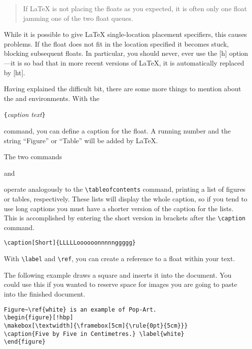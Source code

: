 \begin{quote}
If \LaTeX{} is not placing the floats as you expected,
it is often only one float jamming one of the two float queues.
\end{quote}                 

While it is possible to give \LaTeX{}  single-location placement
specifiers, this causes problems.  If the float does not fit in the
location specified it becomes stuck, blocking subsequent floats.
In particular, you should never, ever use the [h] option---it is so bad
that in more recent versions of \LaTeX, it is automatically replaced by
[ht].

\bigskip
\noindent Having explained the difficult bit, there are some more things to
mention about the  and  environments.
With the 

\begin{lscommand}
\verb|{|\emph{caption text}\verb|}|
\end{lscommand}

\noindent command, you can define a caption for the float. A running number and
the string ``Figure'' or ``Table'' will be added by \LaTeX.

The two commands

\begin{lscommand}
 and  
\end{lscommand}

\noindent operate analogously to the \verb|\tableofcontents| command,
printing a list of figures or tables, respectively.  These lists will
display the whole caption, so if you tend to use long captions
you must have a shorter version of the caption for the lists.
This is accomplished by entering the short version in brackets after
the \verb|\caption| command.
\begin{code}
\verb|\caption[Short]{LLLLLoooooonnnnnggggg}| 
\end{code}

With \verb|\label| and \verb|\ref|, you can create a reference to a float 
within your text.

The following example draws a square and inserts it into the
document. You could use this if you wanted to reserve space for images
you are going to paste into the finished document.

\begin{code}
\begin{verbatim}
Figure~\ref{white} is an example of Pop-Art.
\begin{figure}[!hbp]
\makebox[\textwidth]{\framebox[5cm]{\rule{0pt}{5cm}}}
\caption{Five by Five in Centimetres.} \label{white}
\end{figure}
\end{verbatim}
\end{code}

